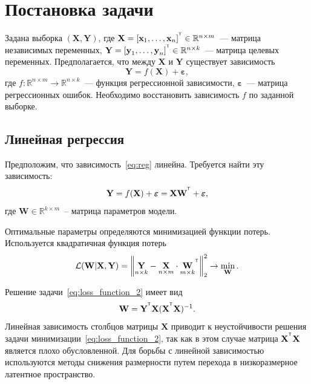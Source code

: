 \documentclass[12pt]{article}
\newcommand{\bY}{\mathbf{Y}}
\newcommand{\bX}{\mathbf{X}}
\newcommand{\bW}{\mathbf{W}}
\newcommand{\T}{^{\text{\tiny\sffamily\upshape\mdseries T}}}
\begin{document}
\section{Постановка задачи}

Задана выборка $(\bX, \bY)$, где $\textbf{X} = [\textbf{x}_1, \dots, \textbf{x}_{n}]^{\T} \in \mathbb{R}^{n \times m}$~--- матрица независимых переменных, $\textbf{Y} = [\textbf{y}_1, \dots, \textbf{y}_n]^{\T} \in \mathbb{R}^{n \times k}$~--- матрица целевых переменных. Предполагается, что между $\bX$ и $\bY$ существует зависимость
\begin{equation}
	\bY = f(\bX) + \boldsymbol{\varepsilon},
	\label{eq:reg}
\end{equation}
где $f: \mathbb{R}^{n \times m} \to \mathbb{R}^{n \times k}$~--- функция регрессионной зависимости, $\boldsymbol{\varepsilon}$~--- матрица регрессионных ошибок. Необходимо восстановить зависимость $f$ по заданной выборке.

\subsection{Линейная регрессия}
Предположим, что зависимость~\eqref{eq:reg} линейна. Требуется найти эту зависимость:
\begin{equation}
	\bY = f(\bX) + \boldsymbol{\varepsilon}=\bX \bW^{\T} + \boldsymbol{\varepsilon},
	\label{eq:model}
\end{equation}
 где $\bW \in \mathbb{R}^{k \times m}$~-- матрица параметров модели.

Оптимальные параметры определяются минимизацией функции потерь. Используется квадратичная функция потерь
\begin{equation}
	\mathcal{L}({\bW} | {\bX}, {\bY}) = {\left\| \underset{n \times k}{\bY}  - \underset{n \times m}{\bX} \cdot \underset{m \times k}{\bW}^{\T} \right\| }_2^2 \rightarrow\min_{\bW}.
	\label{eq:loss_function_2}
\end{equation}

Решение задачи~\eqref{eq:loss_function_2} имеет вид
\begin{equation*}
	\bW = \bY^{\T} \bX (\bX^{\T} \bX)^{-1}.
\end{equation*}
Линейная зависимость столбцов матрицы $\bX$ приводит к неустойчивости решения задачи минимизации~\eqref{eq:loss_function_2}, так как в этом случае матрица ${\bX}^{\T} \bX$ является плохо обусловленной. Для борьбы с линейной зависимостью используются методы снижения размерности путем перехода в низкоразмерное латентное пространство.
\end{document}
